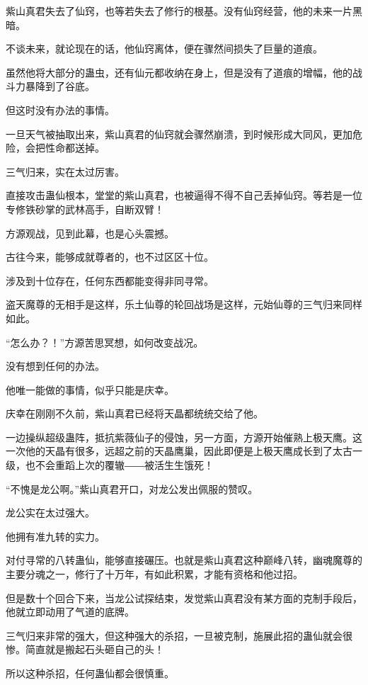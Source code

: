 
\begin{this_body}

紫山真君失去了仙窍，也等若失去了修行的根基。没有仙窍经营，他的未来一片黑暗。

不谈未来，就论现在的话，他仙窍离体，便在骤然间损失了巨量的道痕。

虽然他将大部分的蛊虫，还有仙元都收纳在身上，但是没有了道痕的增幅，他的战斗力暴降到了谷底。

但这时没有办法的事情。

一旦天气被抽取出来，紫山真君的仙窍就会骤然崩溃，到时候形成大同风，更加危险，会把性命都送掉。

三气归来，实在太过厉害。

直接攻击蛊仙根本，堂堂的紫山真君，也被逼得不得不自己丢掉仙窍。等若是一位专修铁砂掌的武林高手，自断双臂！

方源观战，见到此幕，也是心头震撼。

古往今来，能够成就尊者的，也不过区区十位。

涉及到十位存在，任何东西都能变得非同寻常。

盗天魔尊的无相手是这样，乐土仙尊的轮回战场是这样，元始仙尊的三气归来同样如此。

“怎么办？！”方源苦思冥想，如何改变战况。

没有想到任何的办法。

他唯一能做的事情，似乎只能是庆幸。

庆幸在刚刚不久前，紫山真君已经将天晶都统统交给了他。

一边操纵超级蛊阵，抵抗紫薇仙子的侵蚀，另一方面，方源开始催熟上极天鹰。这一次他的天晶有很多，远超之前的天晶鹰巢，因此即便是上极天鹰成长到了太古一级，也不会重蹈上次的覆辙――被活生生饿死！

“不愧是龙公啊。”紫山真君开口，对龙公发出佩服的赞叹。

龙公实在太过强大。

他拥有准九转的实力。

对付寻常的八转蛊仙，能够直接碾压。也就是紫山真君这种巅峰八转，幽魂魔尊的主要分魂之一，修行了十万年，有如此积累，才能有资格和他过招。

但是数十个回合下来，当龙公试探结束，发觉紫山真君没有某方面的克制手段后，他就立即动用了气道的底牌。

三气归来非常的强大，但这种强大的杀招，一旦被克制，施展此招的蛊仙就会很惨。简直就是搬起石头砸自己的头！

所以这种杀招，任何蛊仙都会很慎重。


\end{this_body}
